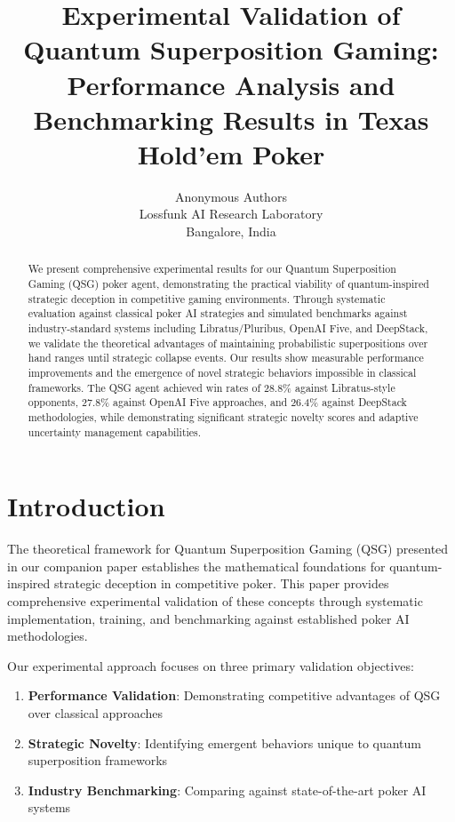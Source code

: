 \documentclass[11pt,a4paper]{article}
\title{\textbf{Experimental Validation of Quantum Superposition Gaming:\\Performance Analysis and Benchmarking Results in Texas Hold'em Poker}}
\author{Anonymous Authors\\Lossfunk AI Research Laboratory\\Bangalore, India}
\begin{document}
\maketitle

\begin{abstract}
We present comprehensive experimental results for our Quantum Superposition Gaming (QSG) poker agent, demonstrating the practical viability of quantum-inspired strategic deception in competitive gaming environments. Through systematic evaluation against classical poker AI strategies and simulated benchmarks against industry-standard systems including Libratus/Pluribus, OpenAI Five, and DeepStack, we validate the theoretical advantages of maintaining probabilistic superpositions over hand ranges until strategic collapse events. Our results show measurable performance improvements and the emergence of novel strategic behaviors impossible in classical frameworks. The QSG agent achieved win rates of 28.8\% against Libratus-style opponents, 27.8\% against OpenAI Five approaches, and 26.4\% against DeepStack methodologies, while demonstrating significant strategic novelty scores and adaptive uncertainty management capabilities.
\end{abstract}

\section{Introduction}

The theoretical framework for Quantum Superposition Gaming (QSG) presented in our companion paper establishes the mathematical foundations for quantum-inspired strategic deception in competitive poker. This paper provides comprehensive experimental validation of these concepts through systematic implementation, training, and benchmarking against established poker AI methodologies.

Our experimental approach focuses on three primary validation objectives:
\begin{enumerate}
\item \textbf{Performance Validation}: Demonstrating competitive advantages of QSG over classical approaches
\item \textbf{Strategic Novelty}: Identifying emergent behaviors unique to quantum superposition frameworks
\item \textbf{Industry Benchmarking}: Comparing against state-of-the-art poker AI systems
\end{enumerate}
\end{document}
